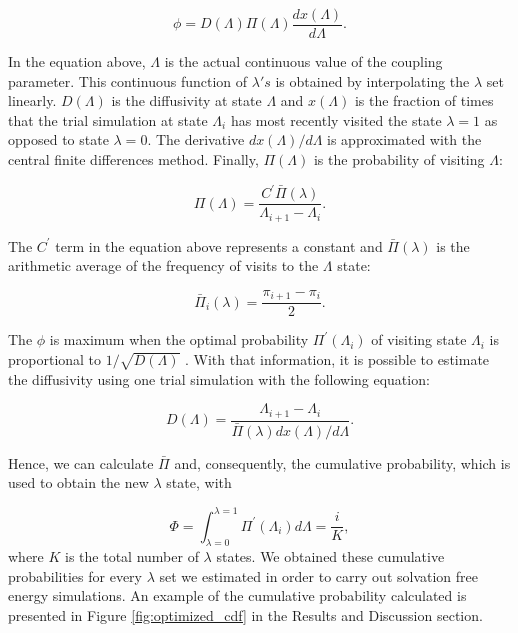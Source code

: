 	\begin{equation}
	\phi = D(\Lambda) \Pi (\Lambda) \dfrac{dx(\Lambda)}{d \Lambda}.
	\label{eqn:stream}
	\end{equation}
	
	In the equation above, $\Lambda$ is the actual continuous value of the coupling parameter. This continuous function of $\lambda 's$ is obtained by interpolating the $\lambda$ set linearly. $D(\Lambda)$ is the diffusivity at  state $\Lambda$ and $x(\Lambda)$ is the fraction of times that the trial simulation at state $\Lambda_{i}$ has most recently visited the state $\lambda=1$ as opposed to state $\lambda=0$. The derivative ${dx(\Lambda)}/{d \Lambda}$ is approximated with the central finite differences method. Finally, $\Pi (\Lambda)$ is the probability of visiting $\Lambda$:
	
	\begin{equation}
	\Pi (\Lambda) = \dfrac{C^{'} \bar{\Pi} (\lambda)}{\Lambda_{i+1} - \Lambda_{i}}.
	\label{eqn:plambda}
	\end{equation}
	
	The $C^{'} $ term in the equation above represents a constant and $\bar{\Pi} (\lambda)$ is the arithmetic average of the frequency of visits to the $\Lambda$ state:
	
	\begin{equation}
	\bar{\Pi}_{i} (\lambda) = \dfrac{\pi_{i+1} - \pi_{i}}{2}.
	\label{eqn:barplambda}
	\end{equation}
	
	The $\phi$ is maximum when the optimal probability $\Pi^{'}(\Lambda_{i})$ of visiting state $\Lambda_{i}$ is proportional to $1/\sqrt{D(\Lambda)}$ \cite{trebst2004}. With that information, it is possible to estimate the diffusivity using one trial simulation with the following equation:
	
	\begin{equation}
	D(\Lambda) = \dfrac{\Lambda_{i+1} - \Lambda_{i}}{\bar{\Pi} (\lambda) {dx(\Lambda)}/{d \Lambda}}.
	\label{eqn:diff}
	\end{equation}
	
	Hence, we can calculate $\bar{\Pi} $ and, consequently, the cumulative probability, which is used to obtain the new $\lambda$ state, with
	
	\begin{equation}
	\Phi = \int_{\lambda =0}^{\lambda =1} \Pi^{'}(\Lambda_{i}) d \Lambda = \dfrac{i}{K},
	\label{eqn:cumfun}
	\end{equation}
	where $K$ is the total number of $\lambda$ states. We obtained these cumulative probabilities for every $\lambda$ set we estimated in order to carry out solvation free energy simulations. An example of the cumulative probability calculated is presented in Figure \ref{fig:optimized_cdf} in the Results and Discussion section.

